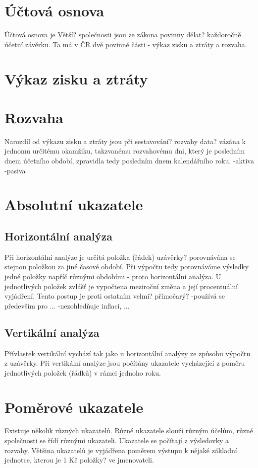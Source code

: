 \section{Účtová osnova}
Účtová osnova je 
Větší? společnosti jsou ze zákona povinny dělat? každoročně účetní závěrku. Ta má v ČR dvě povinné části - výkaz zisku a ztráty a rozvaha. 
\section{Výkaz zisku a ztráty}
\section{Rozvaha}
Narozdíl od výkazu zisku a ztráty jsou při sestavování? rozvahy data? vázána k jednomu určitému okamžiku, takzvanému rozvahovému dni, který je posledním dnem účetního období, zpravidla tedy posledním dnem kalendářního roku.
-aktiva
-pasiva

\section{Absolutní ukazatele}

\subsection{Horizontální analýza}
Při horizontální analýze je určitá položka (řádek) uzávěrky? porovnávána se stejnou položkou za jiné časové období. Při výpočtu tedy porovnáváme výsledky jedné položky napříč různými obdobími - proto horizontální analýza. U jednotlivých položek zvlášť je vypočtena meziroční změna a její procentuální vyjádření. Tento postup je proti ostatním velmi? přímočarý?
-používá se především pro ...
-nezohledňuje inflaci, ...

\subsection{Vertikální analýza}
Přívlastek vertikální vychází tak jako u horizontální analýzy ze způsobu výpočtu z uzávěrky. Při vertikální analýze jsou počítány ukazatele vycházející z poměru jednotlivých položek (řádků) v rámci jednoho roku.

\section{Poměrové ukazatele}
Existuje několik různých ukazatelů. Různé ukazatele slouží různým účelům, různé společnosti se řídí různými ukazateli. Ukazatele se počítají z výsledovky a rozvahy. Většina ukazatelů je vyjádřena poměrem výstupu k nějaké základní jednotce, kterou je 1 Kč položky? ve jmenovateli.

